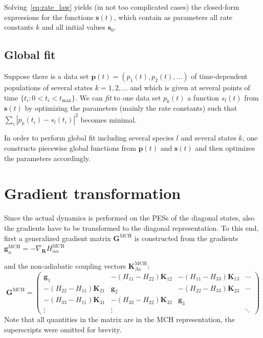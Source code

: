 \documentclass[a4paper,11pt,DIV=15,openany,twoside=false]{scrbook}
\newcommand{\tthdump}[1]{#1}
\newcommand{\VEC}[1]{\ensuremath{\mathbf{#1}}}
\begin{document}
Solving~\eqref{eq:rate_law} yields (in not too complicated cases) the closed-form expressions for the functions $\VEC{s}(t)$, which contain as parameters all rate constants $k$ and all initial values $\VEC{s}_0$.

\subsection{Global fit}

Suppose there is a data set $\VEC{p}(t)=(p_1(t),p_2(t),\dots)$ of time-dependent populations of several states $k=1,2,\dots$ and which is given at several points of time $\{t_i: 0<t_i<t_\mathrm{max}\}$.
We can \textit{fit} to one data set $p_k(t)$ a function $s_l(t)$ from $\VEC{s}(t)$ by optimizing the parameters (mainly the rate constants) such that $\sum_i |p_k(t_i)-s_l(t_i)|^2$ becomes minimal.

In order to perform global fit including several species $l$ and several states $k$, one constructs piecewise global functions from $\VEC{p}(t)$ and $\VEC{s}(t)$ and then optimizes the parameters accordingly.




\section{Gradient transformation}\label{met:gradtra}

Since the actual dynamics is performed on the PESs of the diagonal states, also the gradients have to be transformed to the diagonal representation. To this end, first a generalized gradient matrix $\VEC{G}^{\text{MCH}}$ is constructed from the gradients %
\tthdump{%
$\VEC{g}^{\text{MCH}}_\alpha=-\nabla_\VEC{R}H_{\alpha\alpha}^{\text{MCH}}$%
}
and the non-adiabatic coupling vectors 
$\VEC{K}_{\beta\alpha}^{\text{MCH}}$:
\begin{equation}
  \VEC{G}^{\text{MCH}}=
  \begin{pmatrix}
    \VEC{g}_1   &-(H_{11}-H_{22})\VEC{K}_{12} &-(H_{11}-H_{33})\VEC{K}_{13} &\cdots\\
    -(H_{22}-H_{11})\VEC{K}_{21}      &\VEC{g}_2      &-(H_{22}-H_{33})\VEC{K}_{23}&\cdots\\
    -(H_{33}-H_{11})\VEC{K}_{31}      &-(H_{33}-H_{22})\VEC{K}_{32} &\VEC{g}_3\\
    \vdots      &\vdots         &       &\ddots
  \end{pmatrix}
\end{equation}
Note that all quantities in the matrix are in the MCH representation, the superscripts were omitted for brevity.
\end{document}
